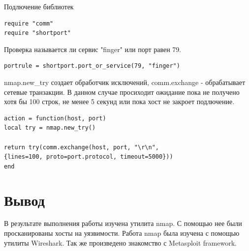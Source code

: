 \documentclass[10pt,a4paper]{report}
\begin{document}
Подлючение библиотек

\begin{verbatim}
require "comm"
require "shortport"
\end{verbatim}

Проверка называется ли сервис "finger" или порт равен 79. 
\begin{verbatim}
portrule = shortport.port_or_service(79, "finger")
\end{verbatim}

nmap.new\_try создает обработчик исключений, comm.exchange - обрабатывает сетевые транзакции. В данном случае просиходит ожидание пока не получено хотя бы 100 строк, не менее 5 секунд или пока хост не закроет подлючение.

\begin{verbatim}
action = function(host, port)
local try = nmap.new_try()

return try(comm.exchange(host, port, "\r\n",
{lines=100, proto=port.protocol, timeout=5000}))
end
\end{verbatim}

\newpage

\section{Вывод}

В результате выполнения работы изучена утилита nmap. С помощью нее были просканированы хосты на уязвимости. Работа nmap была изучена с помощью утилиты Wireshark. Так же произведено знакомство с Metasploit framework.
\end{document}
